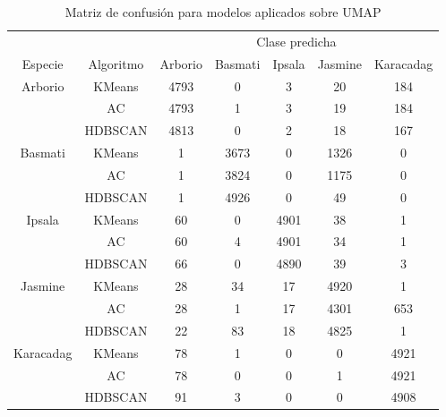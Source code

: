 \documentclass{article}
\begin{document}
\begin{table}[!hbt]
  \caption{Matriz de confusión para modelos aplicados sobre UMAP}
  \label{matriz conf}
  \centering
  \begin{tabular}{ccccccc}
    \toprule
        \multicolumn{2}{c}{} & \multicolumn{5}{c}{Clase predicha} \\
    \cmidrule(r){3-7}
    Especie     & Algoritmo     & Arborio & Basmati & Ipsala & Jasmine & Karacadag  \\
    \midrule
    \multirow{3}{*}{Arborio}& KMeans &  4793 & 0 &  3 & 20 &  184    \\
                            &AC &  4793& 1 &  3& 19 &  184  \\
                            & HDBSCAN &  4813& 0 &  2& 18 &  167  \\
    \multirow{3}{*}{Basmati}& KMeans &  1 & 3673 &  0& 1326 &  0    \\
                            &AC &  1 & 3824 &  0& 1175 &  0  \\
                            & HDBSCAN &  1 & 4926 &  0& 49 &  0  \\
    \multirow{3}{*}{Ipsala} & KMeans &  60 & 0 &  4901& 38 &  1    \\
                            &AC &  60 & 4 &  4901& 34 &  1  \\
                            & HDBSCAN &  66 & 0 &  4890& 39 &  3  \\
    \multirow{3}{*}{Jasmine}& KMeans &  28 & 34 &  17 & 4920 &  1    \\
                            &AC &  28 & 1 &  17 & 4301 &  653   \\
                            & HDBSCAN &  22 & 83 &  18 & 4825 &  1   \\
    \multirow{3}{*}{Karacadag}& KMeans &  78 & 1 &  0 & 0 &  4921    \\
                            &AC &  78 & 0 &  0 & 1 &  4921  \\
                            & HDBSCAN &  91 & 3 &0 & 0 &  4908  \\
    \bottomrule
  \end{tabular}
\end{table}
\end{document}
